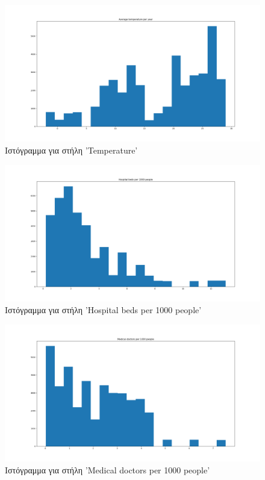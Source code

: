 \documentclass[12pt,a4paper]{article}
\begin{document}
\begin{figure}[H]
	\includegraphics[width=\textwidth]{Figures/Question1/4. Histogram for average temperature per year.png}
	\caption{Ιστόγραμμα για στήλη 'Temperature'}
\end{figure}

\begin{figure}[H]
	\includegraphics[width=\textwidth]{Figures/Question1/5. Histogram for hospital beds per 1000 people.png}
	\caption{Ιστόγραμμα για στήλη 'Hospital beds per 1000 people'}
\end{figure}

\begin{figure}[H]
	\includegraphics[width=\textwidth]{Figures/Question1/6. Histogram for medical doctors per 1000 people.png}
	\caption{Ιστόγραμμα για στήλη 'Medical doctors per 1000 people'}
\end{figure}
\end{document}
